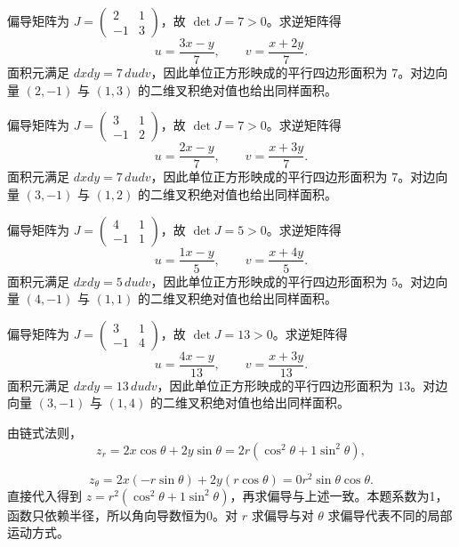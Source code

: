 \documentclass[12pt,fontset=fandol]{ctexart}
\begin{document}
\begin{solve}\label{ans:c33q3}
偏导矩阵为 $J=\begin{pmatrix}2&1\\-1&3\end{pmatrix}$，故 $\det J=7>0$。求逆矩阵得
\[
u=\frac{3x-y}{7},\qquad v=\frac{x+2y}{7}.
\]
面积元满足 $dxdy=7\,dudv$，因此单位正方形映成的平行四边形面积为 $7$。对边向量 $(2,-1)$ 与 $(1,3)$ 的二维叉积绝对值也给出同样面积。
\end{solve}

\begin{solve}\label{ans:c33q4}
偏导矩阵为 $J=\begin{pmatrix}3&1\\-1&2\end{pmatrix}$，故 $\det J=7>0$。求逆矩阵得
\[
u=\frac{2x-y}{7},\qquad v=\frac{x+3y}{7}.
\]
面积元满足 $dxdy=7\,dudv$，因此单位正方形映成的平行四边形面积为 $7$。对边向量 $(3,-1)$ 与 $(1,2)$ 的二维叉积绝对值也给出同样面积。
\end{solve}

\begin{solve}\label{ans:c33q5}
偏导矩阵为 $J=\begin{pmatrix}4&1\\-1&1\end{pmatrix}$，故 $\det J=5>0$。求逆矩阵得
\[
u=\frac{1x-y}{5},\qquad v=\frac{x+4y}{5}.
\]
面积元满足 $dxdy=5\,dudv$，因此单位正方形映成的平行四边形面积为 $5$。对边向量 $(4,-1)$ 与 $(1,1)$ 的二维叉积绝对值也给出同样面积。
\end{solve}

\begin{solve}\label{ans:c33q6}
偏导矩阵为 $J=\begin{pmatrix}3&1\\-1&4\end{pmatrix}$，故 $\det J=13>0$。求逆矩阵得
\[
u=\frac{4x-y}{13},\qquad v=\frac{x+3y}{13}.
\]
面积元满足 $dxdy=13\,dudv$，因此单位正方形映成的平行四边形面积为 $13$。对边向量 $(3,-1)$ 与 $(1,4)$ 的二维叉积绝对值也给出同样面积。
\end{solve}

\begin{solve}\label{ans:c33q7}
由链式法则，
\[
z_r=2x\cos\theta+2y\sin\theta=2r(\cos^2\theta+1\sin^2\theta),
\]

\[
z_\theta=2x(-r\sin\theta)+2y(r\cos\theta)=0r^2\sin\theta\cos\theta.
\]
直接代入得到 $z=r^2(\cos^2\theta+1\sin^2\theta)$，再求偏导与上述一致。本题系数为1，函数只依赖半径，所以角向导数恒为0。对 $r$ 求偏导与对 $\theta$ 求偏导代表不同的局部运动方式。
\end{solve}
\end{document}
